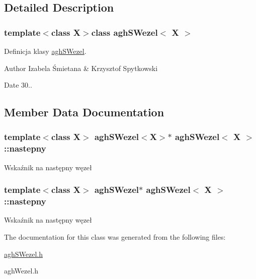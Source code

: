 \subsection{\-Detailed \-Description}
\subsubsection*{template$<$class \-X$>$class agh\-S\-Wezel$<$ X $>$}

\-Definicja klasy \hyperlink{classaghSWezel}{agh\-S\-Wezel}. 

\begin{DoxyAuthor}{\-Author}
\-Izabela Śmietana \& \-Krzysztof \-Spytkowski 
\end{DoxyAuthor}
\begin{DoxyDate}{\-Date}
30.. 
\end{DoxyDate}


\subsection{\-Member \-Data \-Documentation}
\hypertarget{classaghSWezel_a1f5c34d8cfbec7486e76bcc4f5aa38db}{
\subsubsection[{nastepny}]{\setlength{\rightskip}{0pt plus 5cm}template$<$class \-X$>$ {\bf agh\-S\-Wezel}$<$\-X$>$$\ast$ {\bf agh\-S\-Wezel}$<$ \-X $>$\-::{\bf nastepny}}}\label{classaghSWezel_a1f5c34d8cfbec7486e76bcc4f5aa38db}
\-Wskaźnik na następny węzeł \hypertarget{classaghSWezel_a5a6e94ea5d2e10a00be0cbf229f0d999}{
\subsubsection[{nastepny}]{\setlength{\rightskip}{0pt plus 5cm}template$<$class \-X$>$ {\bf agh\-S\-Wezel}$\ast$ {\bf agh\-S\-Wezel}$<$ \-X $>$\-::{\bf nastepny}}}\label{classaghSWezel_a5a6e94ea5d2e10a00be0cbf229f0d999}
\-Wskaźnik na następny węzeł 

\-The documentation for this class was generated from the following files\-:\begin{DoxyCompactItemize}
\item 
\hyperlink{aghSWezel_8h}{agh\-S\-Wezel.\-h}\item 
agh\-Wezel.\-h\end{DoxyCompactItemize}
